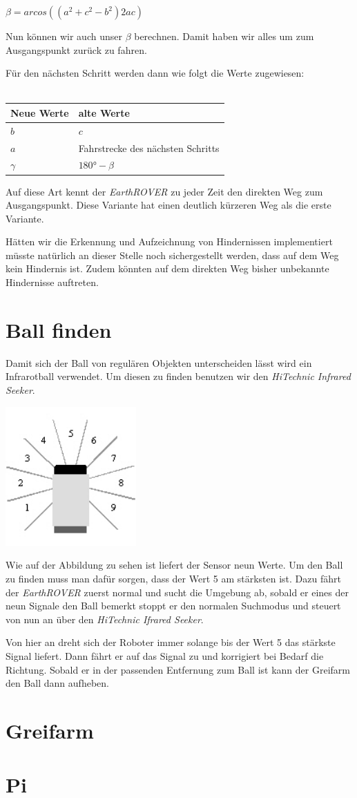 $\beta = arcos((a^2 + c^2 - b^2)2ac)$

Nun können wir auch unser $\beta$ berechnen. Damit haben wir alles um zum Ausgangspunkt zurück zu fahren.

Für den nächsten Schritt werden dann wie folgt die Werte zugewiesen:\\
\\
\begin{tabular}[htbp]{|l|l|}
	\hline
	Neue Werte & alte Werte \\
	\hline
	$b$ & $c$ \\
	\hline
	$a$ & Fahrstrecke des nächsten Schritts \\
	\hline
	$\gamma$ & $180° - \beta$\\
	\hline
\end{tabular}

Auf diese Art kennt der \textit{EarthROVER} zu jeder Zeit den direkten Weg zum Ausgangspunkt. Diese Variante hat einen deutlich kürzeren Weg als die erste Variante.

Hätten wir die Erkennung und Aufzeichnung von Hindernissen implementiert müsste natürlich an dieser Stelle noch sichergestellt werden, dass auf dem Weg kein Hindernis ist. Zudem könnten auf dem direkten Weg bisher unbekannte Hindernisse auftreten.

\section{Ball finden}
Damit sich der Ball von regulären Objekten unterscheiden lässt wird ein Infrarotball verwendet. Um diesen zu finden benutzen wir den \textit{HiTechnic Infrared Seeker}.

\begin{capfigure}
	\includegraphics[width=5cm]{images/implementation/irseeker}
\end{capfigure}

Wie auf der Abbildung zu sehen ist liefert der Sensor neun Werte. Um den Ball zu finden muss man dafür sorgen, dass der Wert 5 am stärksten ist. Dazu fährt der \textit{EarthROVER} zuerst normal und sucht die Umgebung ab, sobald er eines der neun Signale den Ball bemerkt stoppt er den normalen Suchmodus und steuert von nun an über den \textit{HiTechnic Ifrared Seeker}.

Von hier an dreht sich der Roboter immer solange bis der Wert 5 das stärkste Signal liefert. Dann fährt er auf das Signal zu und korrigiert bei Bedarf die Richtung. Sobald er in der passenden Entfernung zum Ball ist kann der Greifarm den Ball dann aufheben.

\section{Greifarm}

\section{Pi}